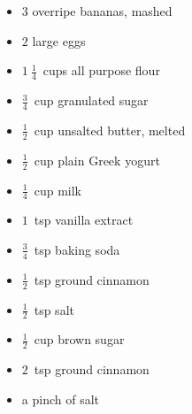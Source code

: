 
\RequirePackage{../recipe}





\begin{minipage}{\textwidth}
\thispagestyle{firstpage}

\ingredients
\begin{multicols*}{3}
\begin{minipage}{\linewidth}
\ingredients[Cake]
\begin{itemize}
    \item $3$ overripe bananas, mashed
    \item $2$ large eggs
    \item $1~\frac{1}{4}$~cups all purpose flour
    \item $\frac{3}{4}$~cup granulated sugar
    \item $\frac{1}{2}$~cup unsalted butter, melted
    \item $\frac{1}{2}$~cup plain Greek yogurt
    \item $\frac{1}{4}$~cup milk
    \item $1$~tsp vanilla extract
    \item $\frac{3}{4}$~tsp baking soda
    \item $\frac{1}{2}$~tsp ground cinnamon
    \item $\frac{1}{2}$~tsp salt
\end{itemize}
\end{minipage}

\columnbreak
\begin{minipage}{\linewidth}
\begin{itemize}
    \item $\frac{1}{2}$~cup brown sugar
    \item $2$~tsp ground cinnamon
    \item a pinch of salt
\end{itemize}
\end{minipage}


\end{multicols*}
\end{minipage}
